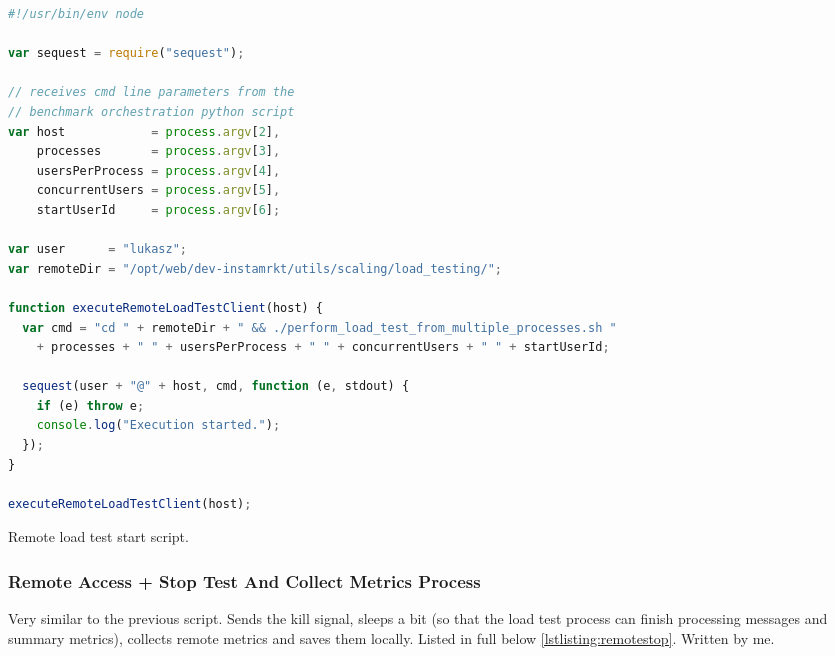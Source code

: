 \documentclass{uvamscse}
\begin{document}
\begin{sourcecode}[H]
\begin{lstlisting}[language=javascript]
#!/usr/bin/env node

var sequest = require("sequest");

// receives cmd line parameters from the
// benchmark orchestration python script
var host            = process.argv[2],
    processes       = process.argv[3],
    usersPerProcess = process.argv[4],
    concurrentUsers = process.argv[5],
    startUserId     = process.argv[6];

var user      = "lukasz";
var remoteDir = "/opt/web/dev-instamrkt/utils/scaling/load_testing/";

function executeRemoteLoadTestClient(host) {
  var cmd = "cd " + remoteDir + " && ./perform_load_test_from_multiple_processes.sh "
    + processes + " " + usersPerProcess + " " + concurrentUsers + " " + startUserId;

  sequest(user + "@" + host, cmd, function (e, stdout) {
    if (e) throw e;
    console.log("Execution started.");
  });
}

executeRemoteLoadTestClient(host);

\end{lstlisting}
\caption{Remote load test start script.}
\label{lstlisting:remotestart}
\end{sourcecode}

\subsubsection{Remote Access + Stop Test And Collect Metrics Process}
Very similar to the previous script. Sends the kill signal, sleeps a bit (so that the load test process can finish processing messages and summary metrics), collects remote metrics and saves them locally. Listed in full below \ref{lstlisting:remotestop}. Written by me.
\end{document}
